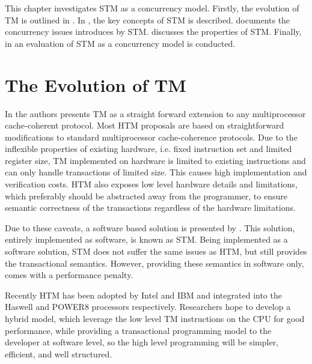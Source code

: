 \makeatletter {}\makeatother
{}
This chapter investigates \ac{STM} as a concurrency model. Firstly, the evolution of \ac{TM} is outlined in . In , the key concepts of \ac{STM} is described.  documents the concurrency issues introduces by \ac{STM}.  discusses the properties of \ac{STM}. Finally, in  an evaluation of \ac{STM} as a concurrency model is conducted.
\label{chap:stm}

\section{The Evolution of \acl{TM}}
\label{sec:tmevo}
In \cite{herlihy1993transactional} the authors presents \ac{TM} as a straight forward extension to any multiprocessor cache-coherent protocol. Most \ac{HTM} proposals are based on straightforward modifications to standard multiprocessor cache-coherence protocols\cite{herlihy2011tm}. Due to the inflexible properties of existing hardware, i.e. fixed instruction set and limited register size, \ac{TM} implemented on hardware is limited to existing instructions and can only handle transactions of limited size\cite{dragojevic2011stm}. This causes high implementation and verification costs\cite{cascaval2008software}. \ac{HTM} also exposes low level hardware details and limitations\cite{herlihy2011tm}, which preferably should be abstracted away from the programmer, to ensure semantic correctness of the transactions regardless of the hardware limitations. 

Due to these caveats, a software based solution is presented by \cite{shavit1997software}. This solution, entirely implemented as software, is known as \acl{STM}. Being implemented as a software solution, \ac{STM} does not suffer the same issues as \ac{HTM}, but still provides the transactional semantics. However, providing these semantics in software only, comes with a performance penalty\cite{cascaval2008software}\cite{dragojevic2011stm}.

Recently \ac{HTM} has been adopted by Intel and IBM and integrated into the Haswell and POWER8 processors respectively\cite{Anthes:2014:RSP:2684442.2667109}. Researchers hope to develop a hybrid model, which leverage the low level \ac{TM} instructions on the \ac{CPU} for good performance, while providing a transactional programming model to the developer at software level, so the high level programming will be simpler, efficient, and well structured\cite{Anthes:2014:RSP:2684442.2667109}.

